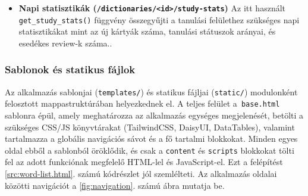 \begin{itemize}
\begin{lstlisting}[language=Python]
def update_item_after_answer(item, difficulty, dictionary):
    now = timezone.now()
    today = date.today()
    was_new = item.status == "new"
    was_learning = item.status == "learning"

    if dictionary:
        daily_stats = get_or_create_daily_stats(dictionary, today)
        
    item.last_reviewed = now

    if difficulty == 0:  # Again -> restart
        item.status = "learning"
        item.repetitions = 0
        item.ease_factor = max(1.3, item.ease_factor - 0.2)

        if was_new and dictionary:
            daily_stats.new_items_studied += 1
            daily_stats.save()

        item.interval = 1 / 1440  # 1 perc
        item.next_review = now + timedelta(minutes=1)
        ...
    else:
        # Hard / Good / Easy esetek
        ...
        
    if item.interval >= 21 and item.status == "reviewing":
        item.status = "mastered"

    item.save()
\end{lstlisting}

  \item \textbf{Napi statisztikák (\texttt{/dictionaries/<id>/study-stats})} Az itt használt \texttt{get\_study\_stats()} függvény összegyűjti a tanulási felülethez szükséges napi statisztikákat mint az új kártyák száma, tanulási státuszok arányai, és esedékes review-k száma..

\end{itemize}

\subsubsection{Sablonok és statikus fájlok}

Az alkalmazás sablonjai (\texttt{templates/}) és statikus fájljai (\texttt{static/}) modulonként felosztott mappastruktúrában helyezkednek el. A teljes felület a\texttt{ base.html} sablonra épül, amely meghatározza az alkalmazás egységes megjelenését, betölti a szükséges CSS/JS könyvtárakat (TailwindCSS, DaisyUI, DataTables), valamint tartalmazza a globális navigációs sávot és a fő tartalmi blokkokat. Minden egyes oldal ebből a sablonból öröklődik, és csak a \texttt{content} és \texttt{scripts} blokkokat tölti fel az adott funkciónak megfelelő HTML-lel és JavaScript-el. Ezt a felépítést \ref{src:word-list.html}. számú kódrészlet jól szemlélteti. Az alkalmazás oldalai közötti navigációt a \ref{fig:navigation}. számú ábra mutatja be. 



